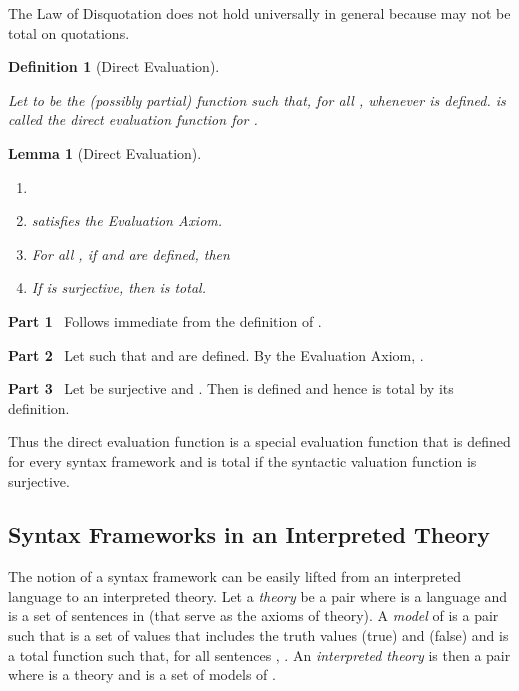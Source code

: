 \documentclass[11pt,fleqn]{article}
\newcommand{\be}{\begin{enumerate}}
\newcommand{\ee}{\end{enumerate}}
\newcommand{\bsp}{\begin{sloppypar}}
\newcommand{\esp}{\end{sloppypar}}
\newcommand{\sglsp}{\ }
\newcommand{\dblsp}{\ \ }
\newtheorem{lem}[thm]{Lemma}
\newtheorem{df}[thm]{Definition}
\newenvironment{proof}{\par\noindent{\bf Proof\dblsp}}{\hfill}
\begin{document}
\bigskip

The Law of Disquotation does not hold universally in general because
 may not be total on quotations.

\begin{df}[Direct Evaluation] \label{df:direct-eval} \em \bsp
Let  to be the (possibly
partial) function such that, for all ,  whenever  is defined.   is called the \emph{direct
  evaluation function for }. \hfill  \esp
\end{df}

\begin{lem}[Direct Evaluation] \label{lem:direct-eval}
\be

  \item[]

  \item  satisfies the Evaluation Axiom.

  \item For all , if  and  are
    defined, then 

  \item If  is surjective, then  is total.

\ee
\end{lem}

\begin{proof}

\bigskip

\noindent \textbf{Part 1} \sglsp Follows immediate from the definition
of .

\bigskip

\noindent \textbf{Part 2} \sglsp Let  such that
 and  are defined.  By the Evaluation Axiom,
.

\bigskip

\noindent \textbf{Part 3} \sglsp Let  be surjective and
.  Then  is
defined and hence  is total by its definition.
\end{proof}

\bigskip

Thus the direct evaluation function is a special evaluation function
that is defined for every syntax framework and is total if the
syntactic valuation function is surjective.

\subsection{Syntax Frameworks in an Interpreted Theory}

The notion of a syntax framework can be easily lifted from an
interpreted language to an interpreted theory.  Let a \emph{theory} be
a pair  where  is a language and  is a set
of sentences in  (that serve as the axioms of theory).  A
\emph{model} of  is a pair 
such that  is a set of values that includes the truth
values  (true) and  (false) and  is a total function such that, for all
sentences , .  An
\emph{interpreted theory} is then a pair  where  is a
theory and  is a set of models of .
\end{document}
